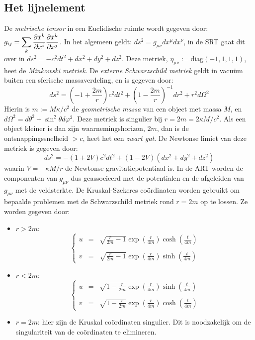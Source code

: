 \subsection{Het lijnelement}
De {\it metrische tensor} in een Euclidische ruimte wordt gegeven door:
$\displaystyle g_{ij}=\sum_k\frac{\partial \bar{x}^k}{\partial x^i}\frac{\partial \bar{x}^k}{\partial x^j}$.
\npar
In het algemeen geldt: $ds^2=g_{\mu\nu}dx^\mu dx^\nu$, in de SRT gaat dit
over in $ds^2=-c^2dt^2+dx^2+dy^2+dz^2$. Deze metriek,
$\eta_{\mu\nu}:=$diag$(-1,1,1,1)$, heet de {\it Minkowski metriek}.
\npar
De {\it externe Schwarzschild metriek} geldt in vacu\"um buiten een sferische
massaverdeling, en is gegeven door:
\[
ds^2=\left(-1+\frac{2m}{r}\right)c^2dt^2+\left(1-\frac{2m}{r}\right)^{-1}dr^2+r^2d\Omega^2
\]
Hierin is $m:=M\kappa/c^2$ de {\it geometrische massa} van een object met
massa $M$, en $d\Omega^2=d\theta^2+\sin^2\theta d\varphi^2$. Deze metriek is
singulier bij $r=2m=2\kappa M/c^2$. Als een object kleiner is dan zijn
waarnemingshorizon, $2m$, dan is de ontsnappingssnelheid $>c$, heet het een
{\it zwart gat}. De Newtonse limiet van deze metriek is gegeven door:
\[
ds^2=-(1+2V)c^2dt^2+(1-2V)(dx^2+dy^2+dz^2)
\]
waarin $V=-\kappa M/r$ de Newtonse gravitatiepotentiaal is. In de ART worden
de componenten van $g_{\mu\nu}$ dus geassocieerd met de potentialen en de
afgeleiden van $g_{\mu\nu}$ met de veldsterkte.
\npar
De Kruskal-Szekeres co\"ordinaten worden gebruikt om bepaalde problemen met
de Schwarzschild metriek rond $r=2m$ op te lossen. Ze worden gegeven door:
\begin{itemize}
\item $r>2m$:
\[
\left\{\begin{array}{ccl}
u&=&\displaystyle{\sqrt{\frac{r}{2m}-1}\exp\left(\frac{r}{4m}\right)\cosh\left(\frac{t}{4m}\right)}\\
&&\\
v&=&\displaystyle{\sqrt{\frac{r}{2m}-1}\exp\left(\frac{r}{4m}\right)\sinh\left(\frac{t}{4m}\right)}
\end{array}\right.
\]
\item $r<2m$:
\[
\left\{\begin{array}{ccl}
u&=&\displaystyle{\sqrt{1-\frac{r}{2m}}\exp\left(\frac{r}{4m}\right)\sinh\left(\frac{t}{4m}\right)}\\
&&\\
v&=&\displaystyle{\sqrt{1-\frac{r}{2m}}\exp\left(\frac{r}{4m}\right)\cosh\left(\frac{t}{4m}\right)}
\end{array}\right.
\]
\item $r=2m$: hier zijn de Kruskal co\"ordinaten singulier. Dit is
noodzakelijk om de singulariteit van de co\"ordinaten te elimineren.
\end{itemize}
